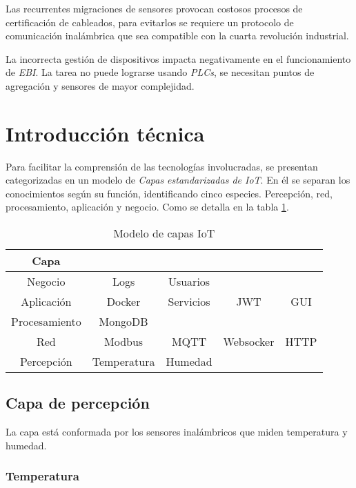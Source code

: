 			Las recurrentes migraciones de sensores provocan costosos procesos de certificación de cableados, para evitarlos se requiere un protocolo de comunicación inalámbrica que sea compatible con la cuarta revolución industrial.
			
			La incorrecta gestión de dispositivos impacta negativamente en el funcionamiento de \emph{EBI}. La tarea no puede lograrse usando \emph{PLCs}, se necesitan puntos de agregación y sensores de mayor complejidad.

\section{Introducción técnica}
\label{introTecnica}

	Para facilitar la comprensión de las tecnologías involucradas, se presentan categorizadas en un modelo de \emph{Capas estandarizadas de IoT}. En él se separan los conocimientos según su función, identificando cinco especies. Percepción, red, procesamiento, aplicación y negocio. Como se detalla en la tabla \ref{tab:modeloCapas}.
	
	\begin{table}
		\centering
		\begin{tabular}{c|cccc}
			Capa 			& 				& 			& 			& 		\\ \hline
			Negocio 		& Logs 			& Usuarios 	& 			& 		\\
			Aplicación 		& Docker 		& Servicios & JWT 		& GUI 	\\
			Procesamiento 	& MongoDB 		& 			& 			& 		\\
			Red 			& Modbus 		& MQTT 		& Websocker & HTTP 	\\
			Percepción 		& Temperatura 	& Humedad 	& 			& 		\\
		\end{tabular}
		\caption{\label{tab:modeloCapas}Modelo de capas IoT}
	\end{table}
	
	\subsection{Capa de percepción}
	\label{capaPercepcion}
	
		La capa está conformada por los sensores inalámbricos que miden temperatura y humedad.
		
		\subsubsection{Temperatura}
		

